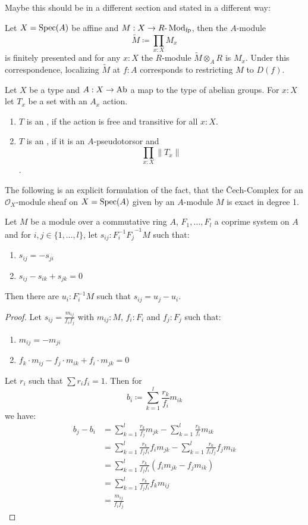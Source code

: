 Maybe this should be in a different section and stated in a different way:
\begin{theorem}
  \label{thm:fp-module}
  Let $X=\operatorname{Spec}(A)$ be affine and $M : X\to R\text{-}\operatorname{Mod}_{\text{fp}}$,
  then the $A$-module
  \[ \tilde{M}\coloneqq\prod_{x:X}M_x \]
  is finitely presented and for any $x:X$ the $R$-module $\tilde{M}\otimes_A R$ is $M_x$.
  Under this correspondence, localizing $\tilde{M}$ at $f:A$ corresponds to restricting $M$ to $D(f)$.
\end{theorem}

\begin{definition}
  Let $X$ be a type and $A:X\to \operatorname{Ab}$ a map to the type of abelian groups.
  For $x:X$ let $T_x$ be a set with an $A_x$ action.
  \begin{enumerate}
  \item $T$ is an , if the action is free and transitive for all $x:X$.
  \item $T$ is an , if it is an $A$-pseudotorsor and
    \[ \prod_{x:X} \| T_x \| \].
  \end{enumerate}
\end{definition}

The following is an explicit formulation of the fact, that the Čech-Complex for an
$\mathcal{O}_X$-module sheaf on $X=\operatorname{Spec}(A)$ given by an $A$-module $M$ is exact in degree 1.
\begin{lemma}
  \label{lem:H1-algebra}
  Let $M$ be a module over a commutative ring $A$, $F_1,\dots,F_l$ a coprime system on $A$
  and for $i,j\in\{1,\dots,l\}$, let $s_{ij}:{F_i^{-1} F_j}^{-1}M$ such that:
  \begin{enumerate}
  \item $s_{ij}=-s_{ji}$
  \item $s_{ij}-s_{ik}+s_{jk}=0$
  \end{enumerate}
  Then there are $u_i:F_i^{-1}M$ such that $s_{ij}=u_j - u_i$.
\end{lemma}
\begin{proof}
  Let $s_{ij}=\frac{m_{ij}}{f_i f_j}$ with $m_{ij}:M$, $f_i:F_i$ and $f_j:F_j$ such that:
  \begin{enumerate}
  \item $m_{ij}=-m_{ji}$
  \item $f_k\cdot m_{ij}-f_j\cdot m_{ik}+f_i\cdot m_{jk}=0$
  \end{enumerate}
  Let $r_i$ such that $\sum r_i f_i =1$.
  Then for
  \[ b_i\coloneqq \sum_{k=1}^l\frac{r_k}{f_i}m_{ik} \]
  we have:
  \begin{align*}
      b_j-b_i &= \sum_{k=1}^l\frac{r_k}{f_j}m_{jk} - \sum_{k=1}^l\frac{r_k}{f_i}m_{ik} \\
              &= \sum_{k=1}^l\frac{r_k}{f_jf_i}f_i m_{jk} - \sum_{k=1}^l\frac{r_k}{f_i f_j} f_j m_{ik} \\
              &= \sum_{k=1}^l\frac{r_k}{f_jf_i}(f_i m_{jk} - f_j m_{ik}) \\
              &= \sum_{k=1}^l\frac{r_k}{f_jf_i}f_km_{ij} \\
              &= \frac{m_{ij}}{f_i f_j}
  \end{align*}
\end{proof}

